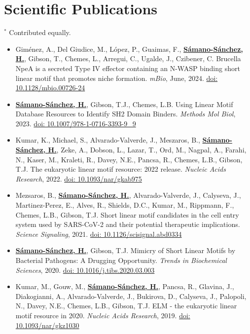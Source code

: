 \documentclass[11pt,a4paper,sans]{moderncv} %
\begin{document}
\section{Scientific Publications}
\vspace{-.1cm}
\footnotesize{$^{\ast}$ Contributed equally.} \hspace{.5cm}
\vspace{.1cm}
\begin{itemize}
  \item Gim\'enez, A., Del Giudice, M., L\'opez, P., Guaimas, F., \textbf{\underline{S\'amano-S\'anchez, H.}}, Gibson, T., Chemes, L., Arregui, C., Ugalde, J., Czibener, C. Brucella NpeA is a secreted Type IV effector containing an N-WASP binding short linear motif that promotes niche formation. \textit{mBio}, June, 2024.
  \href{https://journals.asm.org/doi/10.1128/mbio.00726-24}{doi: 10.1128/mbio.00726-24}
  \item \textbf{\underline{S\'amano-S\'anchez, H.}}, Gibson, T.J., Chemes, L.B. Using Linear Motif Database Resources to Identify SH2 Domain Binders. \textit{Methods Mol Biol}, 2023.
  \href{https://doi.org/10.1007/978-1-0716-3393-9_9}{doi: 10.1007/978-1-0716-3393-9\_9}
  \item Kumar, K., Michael, S., Alvarado-Valverde, J., Meszaros, B., \textbf{\underline{S\'amano-S\'anchez, H.}}, Zeke, A., Dobson, L., Lazar, T., Ord, M., Nagpal, A., Farahi, N., Kaser, M., Kraleti, R., Davey, N.E., Pancsa, R., Chemes, L.B., Gibson, T.J. The eukaryotic linear motif resource: 2022 release. \textit{Nucleic Acids Research}, 2022. \href{https://doi.org/10.1093/nar/gkab975}{doi: 10.1093/nar/gkab975}
  \item Mezsaros, B., \textbf{\underline{S\'amano-S\'anchez, H.}}, Alvarado-Valverde, J., Calyseva, J., Martinez-Perez, E., Alves, R., Shields, D.C., Kumar, M., Rippmann, F., Chemes, L.B., Gibson, T.J. Short linear motif candidates in the cell entry system used by SARS-CoV-2 and their potential therapeutic implications. \textit{Science Signaling}, 2021. \href{https://doi.org/10.1126/scisignal.abd0334}{doi: 10.1126/scisignal.abd0334}
  \item \textbf{\underline{S\'amano-S\'anchez, H.}}, Gibson, T.J. Mimicry of Short Linear Motifs by Bacterial Pathogens: A Drugging Opportunity. \textit{Trends in Biochemical Sciences}, 2020. \href{https://doi.org/10.1016/j.tibs.2020.03.003}{doi: 10.1016/j.tibs.2020.03.003}
  \item Kumar, M., Gouw, M., \textbf{\underline{S\'amano-S\'anchez, H.}}, Pancsa, R., Glavina, J., Diakogianni, A., Alvarado-Valverde, J., Bukirova, D., Calyseva, J., Palopoli, N., Davey, N.E., Chemes, L.B., Gibson, T.J. ELM - the eukaryotic linear motif resource in 2020. \textit{Nucleic Acids Research}, 2019. \href{https://doi.org/10.1093/nar/gkz1030}{doi: 10.1093/nar/gkz1030}

\end{itemize}
\end{document}
